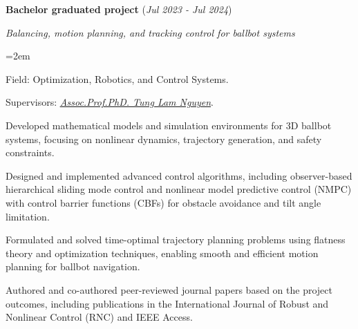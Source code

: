 \documentclass[10pt]{article}
\let\oldhref\href
\renewcommand{\href}[2]{\oldhref{#1}{\ul{#2}}}
\newlength{\skilllabelwidth}
\newcommand{\skill}[2]{%
	\noindent
	\parbox[t]{\skilllabelwidth}{\raggedright\textbf{#1}}%
	\hspace{0.75em}%
	\parbox[t]{\dimexpr\linewidth-\skilllabelwidth-0.75em\relax}{%
		\setlength{\baselineskip}{1.35\baselineskip}%
		#2%
	}\par\vspace{0.7em} %
}
\newcommand{\project}[4]{%
	\noindent \textbf{#1} (\textit{#2})\par
	\vspace{0.5em}
	\noindent \textit{\vspace{0.15cm}#3}\par
	\vspace{0.5em}
	\noindent\hangindent=2em\hangafter=0 #4 \par\normalsize
}
\begin{document}
		\project{Bachelor graduated project}{Jul 2023 - Jul 2024}{Balancing, motion planning, and tracking control for ballbot systems}
		{\begin{soloitemize}
				\item Field: Optimization, Robotics, and Control Systems.
				\item Supervisors:
				\href{https://scholar.google.com/citations?user=MlJ_2-wAAAAJ&hl=en}{\textit{Assoc.Prof.PhD. Tung Lam Nguyen}}.
				\item Developed mathematical models and simulation environments for 3D ballbot systems, focusing on nonlinear dynamics, trajectory generation, and safety constraints.
				\item Designed and implemented advanced control algorithms, including observer-based hierarchical sliding mode control and nonlinear model predictive control (NMPC) with control barrier functions (CBFs) for obstacle avoidance and tilt angle limitation.
				\item Formulated and solved time-optimal trajectory planning problems using flatness theory and optimization techniques, enabling smooth and efficient motion planning for ballbot navigation.
				\item Authored and co-authored peer-reviewed journal papers based on the project outcomes, including publications in the International Journal of Robust and Nonlinear Control (RNC) and IEEE Access.
			\end{soloitemize}
		}

	
%	
%	
%	
%	
%	
%	
	
\end{document}
